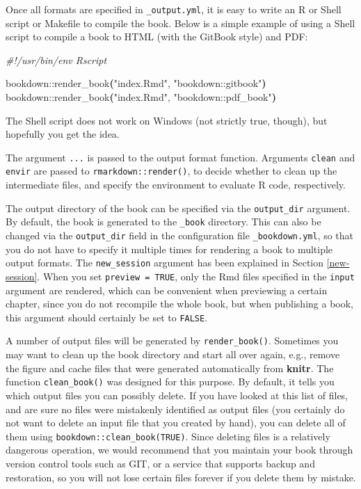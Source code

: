 \documentclass[
  12pt,
]{krantz}
\newenvironment{Shaded}{\begin{snugshade}}{\end{snugshade}}
\newcommand{\CommentTok}[1]{\textcolor[rgb]{0.56,0.35,0.01}{\textit{#1}}}
\newcommand{\ErrorTok}[1]{\textcolor[rgb]{0.64,0.00,0.00}{\textbf{#1}}}
\newcommand{\ExtensionTok}[1]{#1}
\newcommand{\KeywordTok}[1]{\textcolor[rgb]{0.13,0.29,0.53}{\textbf{#1}}}
\newcommand{\StringTok}[1]{\textcolor[rgb]{0.31,0.60,0.02}{#1}}
\theoremstyle{definition}
\theoremstyle{definition}
\theoremstyle{definition}
\theoremstyle{definition}
\theoremstyle{remark}
\begin{document}
Once all formats are specified in \texttt{\_output.yml}, it is easy to write an R or Shell script or Makefile to compile the book. Below is a simple example of using a Shell script to compile a book to HTML (with the GitBook style) and PDF:

\begin{Shaded}
\begin{Highlighting}[]
\CommentTok{\#!/usr/bin/env Rscript}

\ExtensionTok{bookdown::render\_book}\ErrorTok{(}\StringTok{"index.Rmd"}\ExtensionTok{,} \StringTok{"bookdown::gitbook"}\KeywordTok{)}
\ExtensionTok{bookdown::render\_book}\ErrorTok{(}\StringTok{"index.Rmd"}\ExtensionTok{,} \StringTok{"bookdown::pdf\_book"}\KeywordTok{)}
\end{Highlighting}
\end{Shaded}

The Shell script does not work on Windows (not strictly true, though), but hopefully you get the idea.

The argument \texttt{...} is passed to the output format function. Arguments \texttt{clean} and \texttt{envir} are passed to \texttt{rmarkdown::render()}, to decide whether to clean up the intermediate files, and specify the environment to evaluate R code, respectively.

The output directory of the book can be specified via the \texttt{output\_dir} argument. By default, the book is generated to the \texttt{\_book} directory. This can also be changed via the \texttt{output\_dir} field in the configuration file \texttt{\_bookdown.yml}, so that you do not have to specify it multiple times for rendering a book to multiple output formats. The \texttt{new\_session} argument has been explained in Section \ref{new-session}. When you set \texttt{preview\ =\ TRUE}, only the Rmd files specified in the \texttt{input} argument are rendered, which can be convenient when previewing a certain chapter, since you do not recompile the whole book, but when publishing a book, this argument should certainly be set to \texttt{FALSE}.

A number of output files will be generated by \texttt{render\_book()}. Sometimes you may want to clean up the book directory and start all over again, e.g., remove the figure and cache files that were generated automatically from \textbf{knitr}. The function \texttt{clean\_book()} was designed for this purpose. By default, it tells you which output files you can possibly delete. If you have looked at this list of files, and are sure no files were mistakenly identified as output files (you certainly do not want to delete an input file that you created by hand), you can delete all of them using \texttt{bookdown::clean\_book(TRUE)}. Since deleting files is a relatively dangerous operation, we would recommend that you maintain your book through version control tools such as GIT, or a service that supports backup and restoration, so you will not lose certain files forever if you delete them by mistake.
\end{document}
